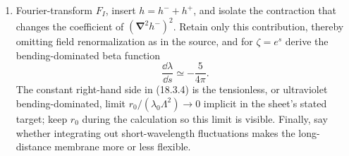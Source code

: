 \begin{enumerate}
\begin{enumerate}
    \item[(c)]
    Fourier-transform \(F_I\), insert \(h=h^-+h^+\), and isolate the
    contraction that changes the coefficient of
    \((\boldsymbol\nabla^2h^-)^2\).  Retain only this contribution, thereby
    omitting field renormalization as in the source, and for
    \(\zeta=e^s\) derive the bending-dominated beta function
    \[
      \frac{\dd\lambda}{\dd s}\simeq-\frac{5}{4\pi}.
      \tag{18.3.4}
    \]
    The constant right-hand side in (18.3.4) is the tensionless, or
    ultraviolet bending-dominated, limit
    \(r_0/(\lambda_0\Lambda^2)\to0\) implicit in the sheet's stated target;
    keep \(r_0\) during the calculation so this limit is visible.  Finally,
    say whether integrating out short-wavelength fluctuations makes the
    long-distance membrane more or less flexible.
  \end{enumerate}


\end{enumerate}
